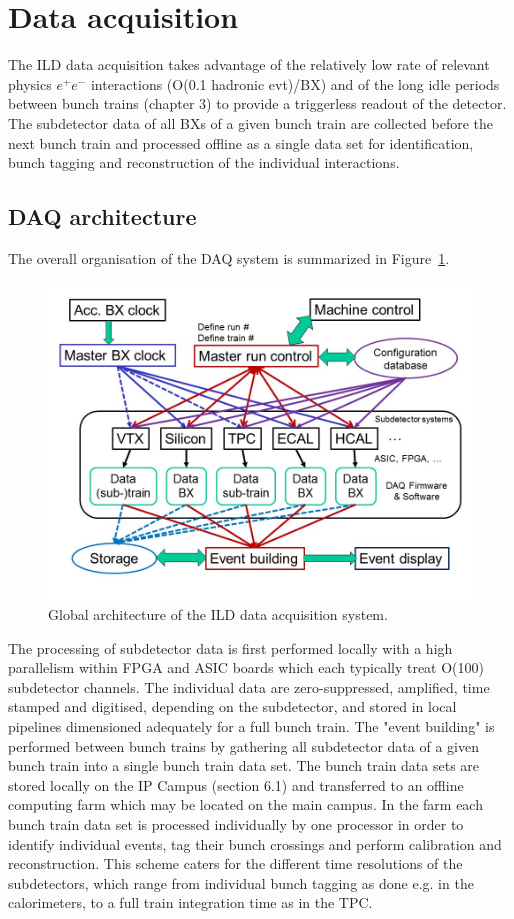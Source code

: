 \section{Data acquisition}

The ILD data acquisition takes advantage of the relatively low rate of relevant physics $e^+e^-$ interactions (O(0.1 hadronic evt)/BX) and of the long idle periods between bunch trains (chapter 3) to provide a triggerless readout of the detector. The subdetector data of all BXs of a given bunch train are collected before the next bunch train and processed offline as a single data set for identification, bunch tagging and reconstruction of the individual interactions. 


\subsection{DAQ architecture}

The overall organisation of the DAQ system is summarized in Figure~\ref{fig:integration:DAQ_architecture}. 

\begin{figure}[t!]
\centering
\includegraphics[width=0.75\hsize]{Integration/fig/DAQ_architecture.jpg}
\caption{\label{fig:integration:DAQ_architecture}Global architecture of the ILD data acquisition system.}
\end{figure}

The processing of subdetector data is first performed locally with a high parallelism within FPGA and ASIC boards which each typically treat O(100) subdetector channels. The individual data are zero-suppressed, amplified, time stamped and digitised, depending on the subdetector, and stored in local pipelines dimensioned adequately for a full bunch train. The "event building" is performed between bunch trains by gathering all subdetector data of a given bunch train into a single bunch train data set. The bunch train data sets are stored locally on the IP Campus (section 6.1) and transferred to an offline computing farm which may be located on the main campus. In the farm each bunch train data set is processed individually by one processor in order to identify individual events, tag their bunch crossings and perform calibration and reconstruction. This scheme caters for the different time resolutions of the subdetectors, which range from individual bunch tagging as done e.g. in the calorimeters, to a full train integration time as in the TPC.

